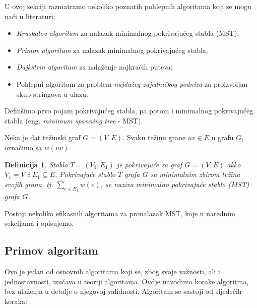 \documentclass[a4paper, utf8, 11pt, colorlinks]{book}
\newtheorem{definition}{Definicija}
\begin{document}
U ovoj sekciji razmatramo nekoliko poznatih pohlepnih algoritama koji se mogu naći u literaturi:
\begin{itemize}
	\item  \emph{Kruskalov algoritam} za nalazak minimalnog pokrivajućeg stabla (MST);
	\item  \emph{Primov algoritam} za nalazak minimalnog pokrivajućeg stabla;
	\item  \emph{Dajkstrin algoritam} za nalaženje najkraćih puteva;
	\item  Pohlepni algoritam za problem \emph{najdužeg zajedničkog podniza} za proizvoljan skup stringova u ulazu.
\end{itemize}

Definšimo prvo pojam pokrivajućeg stabla, pa potom i minimalnog pokrivajućeg stabla (eng. \emph{minimum spanning tree} - MST).

Neka je dat težinski graf $G=(V,E)$. Svaku težinu grane $uv \in E $ u grafu $G$, označimo sa $w(uv)$. 
 
\begin{definition}
  Stablo $T =(V_1, E_1)$ je pokrivajuće za graf $G=(V,E)$ akko
  $V_1 = V$ i $E_1 \subseteq E$. Pokrivajuće stablo $T$ grafa $G$ sa minimalnim zbirom težina svojih grana, tj. 
  $\sum_{e \in E_1} w(e)$, se naziva minimalno pokrivajuće stablo (MST) grafa $G$. 
\end{definition}
Postoji nekoliko efikasnih algoritama za pronalazak MST, koje u narednim sekcijama i opisujemo. 


\subsection{Primov algoritam}
Ovo je jedan od osnovnih algoritama koji se, zbog svoje važnosti, ali i jednostavnosti, izučava u teoriji algoritama. Ovdje navodimo korake algoritma, bez ulaženja u detalje o njegovoj validnosti. Algoritam se sastoji od sljedećih koraka:
\end{document}
